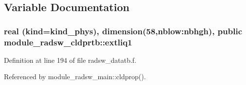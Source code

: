 \subsection{Variable Documentation}
\subsubsection[{\texorpdfstring{extliq1}{extliq1}}]{\setlength{\rightskip}{0pt plus 5cm}real (kind=kind\+\_\+phys), dimension(58,nblow\+:nbhgh), public module\+\_\+radsw\+\_\+cldprtb\+::extliq1}\hypertarget{namespacemodule__radsw__cldprtb_ac68593a33577c720ca8c74eafb3c9f96}{}\label{namespacemodule__radsw__cldprtb_ac68593a33577c720ca8c74eafb3c9f96}


Definition at line 194 of file radsw\+\_\+datatb.\+f.



Referenced by module\+\_\+radsw\+\_\+main\+::cldprop().

